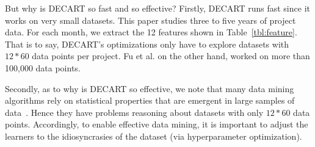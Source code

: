 \documentclass[sigconf,review,anonymous]{acmart}
\begin{document}
But why is DECART   so fast and so effective?
Firstly,  DECART runs fast since it works on   very small datasets. 
This paper studies three to five years of project data. For each month, we  extract the 12 features shown in  Table~\ref{tbl:feature}. That is to say,  DECART's optimizations only have to explore datasets with  $\mathit{12*60}$
 data points per project.
  Fu et al. on the other hand, worked on more than 100,000 data points.
 
 
Secondly, as to why is DECART so effective, we note that many data mining algorithms  rely on  statistical properties that are emergent in   large samples of data~\cite{witten11}. Hence they  
have problems reasoning about  datasets with only $\mathit{12*60}$ data points.  
Accordingly, to enable effective data mining,
it is important to adjust the learners to the   idiosyncrasies of the dataset 
(via hyperparameter optimization).
 
\end{document}
